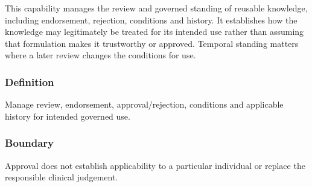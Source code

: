 This capability manages the review and governed standing of reusable knowledge, including endorsement, rejection, conditions and history. It establishes how the knowledge may legitimately be treated for its intended use rather than assuming that formulation makes it trustworthy or approved. Temporal standing matters where a later review changes the conditions for use.

\subsubsection*{Definition}

Manage review, endorsement, approval/\allowbreak{}rejection, conditions and applicable history for intended governed use.

\subsubsection*{Boundary}

Approval does not establish applicability to a particular individual or replace the responsible clinical judgement.

